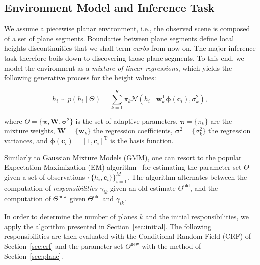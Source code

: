\subsection{Environment Model and Inference Task}
We assume a piecewise planar environment, i.e., the observed scene is composed
of a set of plane segments. Boundaries between plane segments define local
heights discontinuities that we shall term \emph{curbs} from now on. The major
inference task therefore boils down to discovering those plane segments. To this
end, we model the environment as a \emph{mixture of linear regressions}, which
yields the following generative process for the height values:

\begin{equation}
\label{eqn:mixture}
h_i\sim p(h_i\mid\Theta)=\sum_{k=1}^K\pi_k\mathcal{N}(h_i\mid
\mathbf{w}_k^\text{T}\boldsymbol{\phi}(\mathbf{c}_i),\sigma^2_k),
\end{equation}

where $\Theta=\{\boldsymbol{\pi},\mathbf{W},\boldsymbol{\sigma}^2\}$ is the set
of adaptive parameters, $\boldsymbol{\pi}=\{\pi_k\}$ are the mixture weights,
$\mathbf{W}=\{\mathbf{w}_k\}$ the regression coefficients,
$\boldsymbol{\sigma}^2=\{\sigma^2_k\}$ the regression variances, and
$\boldsymbol{\phi}(\mathbf{c}_i)=[1,\mathbf{c}_i]^\text{T}$ is the basis
function.

Similarly to Gaussian Mixture Models (GMM), one can resort to the popular
Expectation-Maximization (EM) algorithm~\cite{dempster77maximum} for estimating
the parameter set $\Theta$ given a set of observations
$\{\{h_i,\mathbf{c}_i\}\}_{i=1}^M$. The algorithm alternates between the
computation of \emph{responsibilities} $\gamma_{ik}$ given an old estimate
$\Theta^\text{old}$, and the computation of $\Theta^\text{new}$ given
$\Theta^\text{old}$ and $\gamma_{ik}$.

In order to determine the number of planes $k$ and the initial responsibilities,
we apply the algorithm presented in Section~\ref{sec:initial}. The following
responsibilities are then evaluated with the Conditional Random Field (CRF) of
Section~\ref{sec:crf} and the parameter set $\Theta^\text{new}$ with the method
of Section~\ref{sec:plane}.
